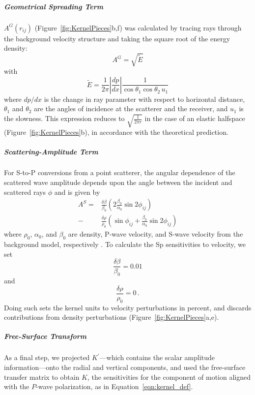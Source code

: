 \documentclass[referee]{gji}
\begin{document}
\subparagraph{Geometrical Spreading Term}  $A^G(r_{ij})$ (Figure~\ref{fig:KernelPieces}b,f) was calculated by tracing rays through the background velocity structure and taking the square root of the energy density:
\begin{equation}
A^G=\sqrt{\tilde E}
\end{equation}
with
\begin{equation}
\tilde E=\frac{1}{2\pi} \left| \frac{dp}{dx} \right| \frac{1}{\cos\theta_1 \cos\theta_2 \, u_1}
\end{equation}
where $dp/dx$ is the change in ray parameter with respect to horizontal distance, $\theta_1$ and $\theta_2$ are the angles of incidence at the scatterer and the receiver, and $u_1$ is the slowness. This expression reduces to
$
\sqrt{\frac{1}{2\pi r}}
$
in the case of an elastic halfspace (Figure~\ref{fig:KernelPieces}b), in accordance with the theoretical prediction.

\subparagraph{Scattering-Amplitude Term} For S-to-P conversions from a point scatterer, the angular dependence of the scattered wave amplitude depends upon the angle between the incident and scattered rays $\phi$ and is given by
\begin{equation}
\begin{split}
A^S= 
 &  \frac{ \delta \beta}{\beta_0} \left( 2  \frac{\beta_0}{\alpha_0} \sin{2\phi_{ij}} \right) \\
- & \frac{ \delta \rho}{\rho_0} \left(\sin{\phi_{ij}} + \frac{\beta_0}{\alpha_0}  \sin{2\phi_{ij}} \right)
 \end{split}
\end{equation}
where $\rho_0$, $\alpha_0$, and $\beta_0$ are density, P-wave velocity, and S-wave velocity from the background model, respectively \citep{Bostock1999}.  To calculate the Sp sensitivities to velocity, we set 
\begin{equation}
\frac{ \delta \beta}{\beta_0}=0.01
\end{equation}
and
\begin{equation}
\frac{ \delta \rho}{\rho_0}=0 \,  .
\end{equation}
Doing such sets the kernel units to velocity perturbations in percent, and discards contributions from density perturbations (Figure~\ref{fig:KernelPieces}a,e).

\subparagraph{Free-Surface Transform}
As a final step, we projected $K^\prime$---which contains the scalar amplitude information---onto the radial and vertical components, and used the free-surface transfer matrix to obtain $K$, the sensitivities for the component of motion aligned with the $P$-wave polarization, as in Equation~\ref{eqn:kernel_def}.
\end{document}
